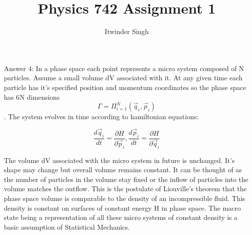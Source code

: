 \documentclass[12pt]{article}
\begin{document}
 
 
\title{Physics 742 Assignment 1}
\author{Itwinder Singh\\ %
}

\maketitle


Answer 4:     In a phase space each point represents a micro system composed of N particles. Assume a small volume dV associated with it. At any given time each particle has it's specified position and momentum coordinates so the phase space has 6N dimensions
$$\Gamma=\Pi_{i=1}^N (\Vec{q}_i,\vec{p}_i) $$. 
The system evolves in time according to hamiltonian equations:

\begin{equation}
    \frac{d\vec{q}_i}{dt}=\frac{\partial{H}}{\partial\vec{p}_i},  
    \frac{d\vec{p}_i}{dt}=\frac{\partial{H}}{\partial\vec{q}_i}
\end{equation}

The volume dV associated with the micro system in future is unchanged. It's shape may change but overall volume remains constant. It can be thought of as the number of particles in the volume stay fixed or the inflow of particles into the volume matches the outflow. This is the postulate of Liouville's theorem that the phase space volume is comparable to the density of an incompressible fluid. 
This density is constant on surfaces of constant energy H in phase space. The macro state being a representation of all these micro systems of constant density is a basic assumption of Statistical Mechanics.

    


 
\end{document}
